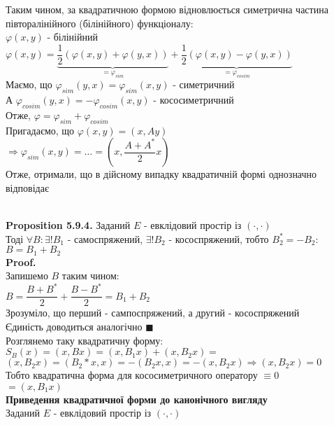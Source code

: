 \documentclass[a4paper, 14pt]{extarticle}
\def\prp#1{\textbf{Proposition {#1}}}
\def\proof{\textbf{Proof.}\\}
\def\bigline{\vspace{5mm}\\}
\def\qed{$\blacksquare$}
\begin{document}
Таким чином, за квадратичною формою відновлюється симетрична частина півторалінійного (білінійного) функціоналу:\\
$\varphi(x,y)$ - білінійний\\
$\varphi(x,y) =  \underbrace{\dfrac{1}{2} \left(\varphi(x,y) + \varphi(y,x) \right)}_{= \varphi_{sim}} + \underbrace{\dfrac{1}{2} \left(\varphi(x,y) - \varphi(y,x) \right)}_{= \varphi_{cosim}}$\\
Маємо, що $\varphi_{sim}(y,x) = \varphi_{sim}(x,y)$ - симетричний\\
А $\varphi_{cosim}(y,x) = -\varphi_{cosim}(x,y)$ - кососиметричний\\
Отже, $\varphi = \varphi_{sim} + \varphi_{cosim}$\\
Пригадаємо, що $\varphi(x,y) = (x,Ay)$\\
$\Rightarrow \varphi_{sim}(x,y) = \dots = \left(x, \dfrac{A+A^*}{2}x \right)$\\
Отже, отримали, що в дійсному випадку квадратичній формі однозначно відповідає\\
\bigline
\prp{5.9.4.} Заданий $E$ - евклідовий простір із $(\cdot,\cdot)$\\
Тоді $\forall B: \exists! B_1$ - самоспряжений, $\exists! B_2$ - кососпряжений, тобто $B_2^* = -B_2$: $B = B_1 + B_2$\\
\proof
Запишемо $B$ таким чином:\\
$B = \dfrac{B+B^*}{2} + \dfrac{B-B^*}{2} = B_1 + B_2$\\
Зрозуміло, що перший - сампоспряжений, а другий - кососпряжений\\
Єдиність доводиться аналогічно \qed
\bigline
Розглянемо таку квадратичну форму:\\
$S_B(x) = (x,Bx) = (x,B_1x) + (x,B_2x) \boxed{=} $\\
$(x,B_2x) = (B_2*x,x) = -(B_2x,x) = -(x,B_2x) \Rightarrow (x,B_2x) = 0$\\
Тобто квадратична форма для кососиметричного оператору $\equiv 0$\\
$\boxed{=} (x,B_1x)$
\bigline
\textbf{Приведення квадратичної форми до канонічного вигляду}\\
Заданий $E$ - евклідовий простір із $(\cdot,\cdot)$\\
\end{document}
